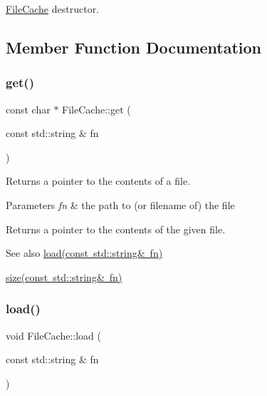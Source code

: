 \mbox{\hyperlink{classsage_1_1FileCache}{File\+Cache}} destructor. 



\subsection{Member Function Documentation}
\mbox{\label{classsage_1_1FileCache_a67fe1af6ccb8d06b7e97dc54a1836eee}} 
\subsubsection{\texorpdfstring{get()}{get()}}
{\footnotesize\ttfamily const char $\ast$ File\+Cache\+::get (\begin{DoxyParamCaption}\item[{const std\+::string \&}]{fn }\end{DoxyParamCaption})}



Returns a pointer to the contents of a file. 


\begin{DoxyParams}{Parameters}
{\em fn} & the path to (or filename of) the file \\
\hline
\end{DoxyParams}
\begin{DoxyReturn}{Returns}
a pointer to the contents of the given file. 
\end{DoxyReturn}
\begin{DoxySeeAlso}{See also}
\mbox{\hyperlink{classsage_1_1FileCache_addb15593e848f038a5d7a7c6c3828053}{load(const std\+::string\& fn)}} 

\mbox{\hyperlink{classsage_1_1FileCache_a369b86f1fb585e5ce5142a7f1f22e38c}{size(const std\+::string\& fn)}} 
\end{DoxySeeAlso}
\mbox{\label{classsage_1_1FileCache_addb15593e848f038a5d7a7c6c3828053}} 
\subsubsection{\texorpdfstring{load()}{load()}}
{\footnotesize\ttfamily void File\+Cache\+::load (\begin{DoxyParamCaption}\item[{const std\+::string \&}]{fn }\end{DoxyParamCaption})}



